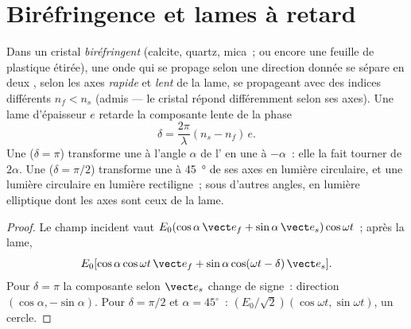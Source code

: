 \section{Biréfringence et lames à retard}

\begin{proposition}\label{prop:b2:plane-waves-polarization:plates}
Dans un cristal \emph{biréfringent} (calcite, quartz, mica~; ou encore une
feuille de plastique étirée), une onde qui se propage selon une direction donnée
se sépare en deux , selon les axes \emph{rapide} et
\emph{lent} de la lame, se propageant avec des indices différents $n_f <
n_s$ (admis --- le cristal répond différemment selon ses axes). Une
lame d'épaisseur $e$ retarde la composante lente de la phase
\[
\delta = \frac{2\pi}\lambda(n_s - n_f)\,e .
\]
Une \emph{} ($\delta = \pi$) transforme une  à
l'angle $\alpha$ de l' en une  à $-\alpha$~: elle
la fait tourner de $2\alpha$. Une \emph{} ($\delta = \pi/2$) transforme une
 à \qty{45}{\degree} de ses axes en lumière circulaire,
et une lumière circulaire en lumière rectiligne~; sous d'autres angles, en lumière
elliptique dont les axes sont ceux de la lame.
\end{proposition}

\begin{proof}
Le champ incident vaut
$E_0(\cos\alpha\,\vect e_f + \sin\alpha\,\vect e_s)\cos\omega t$~; après la lame,
\[
E_0[\cos\alpha\cos\omega t\,\vect e_f + \sin\alpha\cos(\omega t - \delta)\,\vect e_s] .
\]
Pour $\delta = \pi$ la composante selon $\vect e_s$ change de signe~: direction
$(\cos\alpha, -\sin\alpha)$. Pour $\delta = \pi/2$ et $\alpha = 45^\circ$~: $(E_0/\sqrt2)(\cos
\omega t, \sin\omega t)$, un cercle.
\end{proof}

